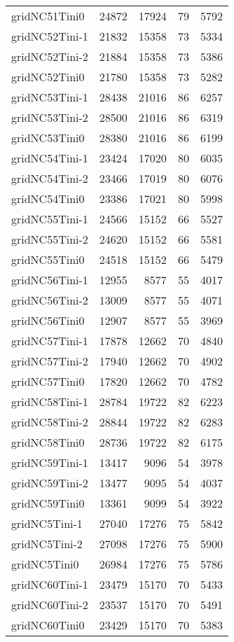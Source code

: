 \begin{longtable}{lrrrr}
gridNC51Tini0 & 24872 & 17924 & 79 & 5792 \\
gridNC52Tini-1 & 21832 & 15358 & 73 & 5334 \\
gridNC52Tini-2 & 21884 & 15358 & 73 & 5386 \\
gridNC52Tini0 & 21780 & 15358 & 73 & 5282 \\
gridNC53Tini-1 & 28438 & 21016 & 86 & 6257 \\
gridNC53Tini-2 & 28500 & 21016 & 86 & 6319 \\
gridNC53Tini0 & 28380 & 21016 & 86 & 6199 \\
gridNC54Tini-1 & 23424 & 17020 & 80 & 6035 \\
gridNC54Tini-2 & 23466 & 17019 & 80 & 6076 \\
gridNC54Tini0 & 23386 & 17021 & 80 & 5998 \\
gridNC55Tini-1 & 24566 & 15152 & 66 & 5527 \\
gridNC55Tini-2 & 24620 & 15152 & 66 & 5581 \\
gridNC55Tini0 & 24518 & 15152 & 66 & 5479 \\
gridNC56Tini-1 & 12955 & 8577 & 55 & 4017 \\
gridNC56Tini-2 & 13009 & 8577 & 55 & 4071 \\
gridNC56Tini0 & 12907 & 8577 & 55 & 3969 \\
gridNC57Tini-1 & 17878 & 12662 & 70 & 4840 \\
gridNC57Tini-2 & 17940 & 12662 & 70 & 4902 \\
gridNC57Tini0 & 17820 & 12662 & 70 & 4782 \\
gridNC58Tini-1 & 28784 & 19722 & 82 & 6223 \\
gridNC58Tini-2 & 28844 & 19722 & 82 & 6283 \\
gridNC58Tini0 & 28736 & 19722 & 82 & 6175 \\
gridNC59Tini-1 & 13417 & 9096 & 54 & 3978 \\
gridNC59Tini-2 & 13477 & 9095 & 54 & 4037 \\
gridNC59Tini0 & 13361 & 9099 & 54 & 3922 \\
gridNC5Tini-1 & 27040 & 17276 & 75 & 5842 \\
gridNC5Tini-2 & 27098 & 17276 & 75 & 5900 \\
gridNC5Tini0 & 26984 & 17276 & 75 & 5786 \\
gridNC60Tini-1 & 23479 & 15170 & 70 & 5433 \\
gridNC60Tini-2 & 23537 & 15170 & 70 & 5491 \\
gridNC60Tini0 & 23429 & 15170 & 70 & 5383 \\

\end{longtable}
